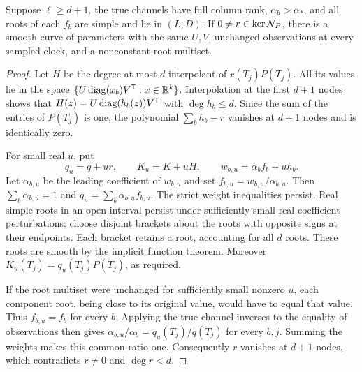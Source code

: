 \begin{lemma}\label{lem:local-fibre}
Suppose $\ell\ge d+1$, the true channels have full column rank,
$\alpha_b>\alpha_*$, and all roots of each $f_b$ are simple and lie
in $(L,D)$. If $0\ne r\in\ker\mathcal N_P$, there is a smooth curve of
parameters with the same $U,V$, unchanged observations at every
sampled clock, and a nonconstant root multiset.
\end{lemma}
\begin{proof}
Let $H$ be the degree-at-most-$d$ interpolant of $r(T_j)P(T_j)$.
All its values lie in the space
$\{U\operatorname{diag}(x_b)V^{\mathsf T}:x\in\mathbb R^k\}$.
Interpolation at the first
$d+1$ nodes shows that
$H(z)=U\operatorname{diag}(h_b(z))V^{\mathsf T}$ with $\deg h_b\le d$.
Since the sum of the entries of $P(T_j)$ is one, the polynomial
$\sum_bh_b-r$ vanishes at $d+1$ nodes and is identically zero.

For small real $u$, put
\[
 q_u=q+ur,\qquad K_u=K+uH,
 \qquad w_{b,u}=\alpha_b f_b+u h_b.
\]
Let $\alpha_{b,u}$ be the leading coefficient of $w_{b,u}$ and set
$f_{b,u}=w_{b,u}/\alpha_{b,u}$. Then
$\sum_b\alpha_{b,u}=1$ and $q_u=\sum_b\alpha_{b,u}f_{b,u}$.
The strict weight inequalities persist. Real simple roots in an open
interval persist under sufficiently small real coefficient
perturbations: choose disjoint brackets about the roots with opposite
signs at their endpoints. Each bracket retains a root, accounting for
all $d$ roots. These roots are smooth by the implicit function theorem.
Moreover $K_u(T_j)=q_u(T_j)P(T_j)$, as required.

If the root multiset were unchanged for sufficiently small nonzero
$u$, each component root, being close to its original value, would have
to equal that value. Thus $f_{b,u}=f_b$ for every $b$.
Applying the true channel inverses to the equality of observations
then gives $\alpha_{b,u}/\alpha_b=q_u(T_j)/q(T_j)$ for every $b,j$.
Summing the weights makes this common ratio one. Consequently $r$
vanishes at $d+1$ nodes, which contradicts $r\ne0$ and $\deg r<d$.
\end{proof}

